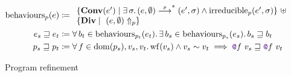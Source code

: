 \begin{figure}[tp]
    \centering
    \\
    \begin{align*}
        	\mathrm{behaviours}_p (e)
        	&\coloneqq
        	\begin{array}{l}
        			\{ \constr[e']{Conv} \mid \exists \sigma \ldotp (e, \emptyset) \step{p}^* (e', \sigma) \wedge \mathrm{irreducible}_p (e', \sigma) \}\ \uplus
        		\\
        			\{ \constr{Div} \mid\ \diverges{p}{(e, \emptyset)} \}
            \end{array}
        \\
            e_s \refined e_t
            &\coloneqq
            \forall b_t \in \mathrm{behaviours}_{p_t} (e_t) \ldotp
            \exists b_s \in \mathrm{behaviours}_{p_s} (e_s) \ldotp
            b_s \refined b_t
        \\
            p_s \refined p_t
            &\coloneqq
            \forall f \in \dom{p_s}, v_s, v_t \ldotp
            \wf{v_s} \wedge v_s \similar v_t \implies
            \lambdCall{\lambdFunc{f}}{v_s} \refined \lambdCall{\lambdFunc{f}}{v_t}
    \end{align*}
    \caption{Program refinement}
    \label{fig:refinement}
\end{figure}
